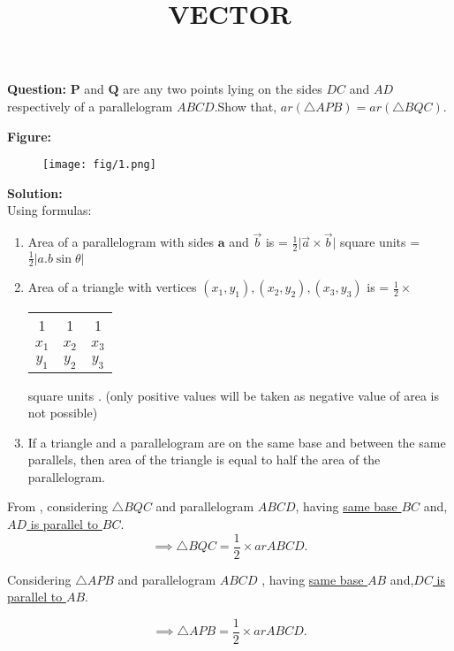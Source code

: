 \documentclass[12pt]{article}
\renewcommand{\vec}{\boldsymbol}
\begin{document}
\title{\textbf{VECTOR}}
\date{}
\maketitle
\textbf{Question:} $\vec{P}$ and $\vec{Q}$ are any two points lying on the sides $DC$ and $AD$ respectively of a parallelogram $ABCD$.Show that, $ar(\triangle APB)=ar(\triangle BQC)$.


\textbf{Figure:}
\begin{figure}[H]
    \centering
    \texttt{[image: fig/1.png]}
    \caption{}
    \label{fig:fig:1}
\end{figure}


\textbf{Solution:}\\
Using formulas: \begin{enumerate}
\item Area of a parallelogram with sides $\vec{a}$ and $\Vec{b}$ is = $\frac{1}{2}\big|\Vec{a}\times\Vec{b}\big|$ square units = $\frac{1}{2}\big|a.b\sin{\theta}\big|$
 \item Area of a triangle with vertices $(x_1,y_1),(x_2,y_2),(x_3,y_3)$ is =  $\frac{1}{2}\times$
  \begin{tabular}{|c c c|}
     1&1&1\\
     $x_1$&$x_2$&$x_3$\\
     $y_1$&$y_2$&$y_3$\\
  \end{tabular} square units . (only positive values will be taken as negative value of area is not possible)

\item If a triangle and a parallelogram are on the same base and between the same parallels, then area of the triangle is equal to half the area of the parallelogram.

\end{enumerate}
From  ,
considering $\triangle BQC$ and parallelogram $ ABCD$, having \underline{same base $BC$} and, \underline{$AD$ is parallel to $BC$}.\\

\begin{equation}
\implies \triangle BQC = \frac{1}{2}\times ar ABCD.
  \label{eq:eq:1}
\end{equation}

Considering $\triangle APB$ and parallelogram $ABCD$ , having \underline{same base $AB$} and,\underline{$DC$ is parallel to $AB$}.

\begin{equation}
\implies \triangle APB = \frac{1}{2}\times ar ABCD.
	\label{eq:eq:2}
\end{equation}
\end{document}
